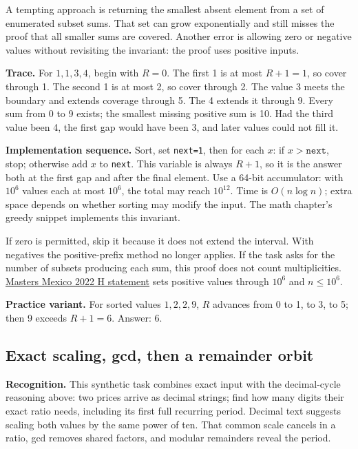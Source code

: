 A tempting approach is returning the smallest absent element from a set of enumerated subset sums. That set can grow exponentially and still misses the proof that all smaller sums are covered. Another error is allowing zero or negative values without revisiting the invariant: the proof uses positive inputs.

\textbf{Trace.} For $1,1,3,4$, begin with $R=0$. The first 1 is at most $R+1=1$, so cover through 1. The second 1 is at most 2, so cover through 2. The value 3 meets the boundary and extends coverage through 5. The 4 extends it through 9. Every sum from 0 to 9 exists; the smallest missing positive sum is 10. Had the third value been 4, the first gap would have been 3, and later values could not fill it.

\textbf{Implementation sequence.} Sort, set \texttt{next=1}, then for each $x$: if $x>\texttt{next}$, stop; otherwise add $x$ to \texttt{next}. This variable is always $R+1$, so it is the answer both at the first gap and after the final element. Use a 64-bit accumulator: with $10^6$ values each at most $10^6$, the total may reach $10^{12}$. Time is $O(n\log n)$; extra space depends on whether sorting may modify the input. The math chapter's greedy snippet implements this invariant.

If zero is permitted, skip it because it does not extend the interval. With negatives the positive-prefix method no longer applies. If the task asks for the number of subsets producing each sum, this proof does not count multiplicities. \href{https://acm.iteso.mx/share/ICPCMXMasters2022_problems.pdf}{Masters Mexico 2022 H statement} sets positive values through $10^6$ and $n\le10^6$.

\textbf{Practice variant.} For sorted values $1,2,2,9$, $R$ advances from 0 to 1, to 3, to 5; then 9 exceeds $R+1=6$. Answer: 6.

\subsection{Exact scaling, gcd, then a remainder orbit}\label{case:orbits}

\textbf{Recognition.} This synthetic task combines exact input with the decimal-cycle reasoning above: two prices arrive as decimal strings; find how many digits their exact ratio needs, including its first full recurring period. Decimal text suggests scaling both values by the same power of ten. That common scale cancels in a ratio, gcd removes shared factors, and modular remainders reveal the period.

